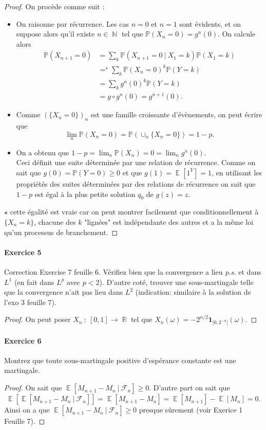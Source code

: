 \documentclass{article}
\theoremstyle{definition}
\numberwithin{equation}{section}
\DeclareMathOperator{\R}{\mathbb{R}}
\DeclareMathOperator{\N}{\mathbb{N}}
\DeclareMathOperator{\E}{\mathbb{E}}
\begin{document}
\begin{proof} On procède comme suit :
\begin{itemize}
    \item On raisonne par récurrence. Les cas $n=0$ et $n=1$ sont évidents, et on suppose alors qu'il existe $n\in\N$ tel que $\mathbb{P}(X_n=0)=g^n(0)$. On calcule alors
    \begin{align*} 
    \mathbb{P}(X_{n+1}=0) &= \sum_k \mathbb{P}(X_{n+1}=0~|~X_1=k)\mathbb{P}(X_1=k)\\
    &=^\star \sum_k \mathbb{P}(X_n=0)^k\mathbb{P}(Y=k)\\
    &= \sum_k g^n(0)^k \mathbb{P}(Y=k)\\
    &= g\circ g^n(0) = g^{n+1}(0). 
    \end{align*}
    \item Comme $(\{X_n=0\})_n$ est une famille croissante d'évènements, on peut écrire que 
    $$ \lim_n\mathbb{P}(X_n=0) = \mathbb{P}(\cup_n\{X_n=0\}) = 1-p. $$
    \item On a obtenu que $1-p=\lim_n\mathbb{P}(X_n)=0 = \lim_n g^n(0)$.\\
    Ceci définit une suite déterminée par une relation de récurrence. Comme on sait que $g(0)=\mathbb{P}(Y=0)\geq 0$ et que $g(1)=\E[1^Y]=1$, en utilisant les propriétés des suites déterminées par des relations de récurrence on sait que $1-p$ est égal à la plus petite solution $q_0$ de $g(z)=z$. 
\end{itemize}
$\star$ cette égalité est vraie car on peut montrer facilement que conditionnellement à $\{X_n=k\}$, chacune des $k$ "lignées" est indépendante des autres et a la même loi qu'un processus de branchement.
\end{proof}



\paragraph{Exercice 5} Correction Exercise 7 feuille 6.
Vérifiez bien que la convergence a lieu \textit{p.s.} et dans $L^1$ (en fait dans $L^p$ avec $p < 2$).
D'autre coté, trouver une sous-martingale telle que la convergence n'ait pas lieu dans $L^2$ (indication: similaire à la solution de l'exo 3 feuille 7).

\begin{proof}
On peut poser $X_n~:~[0,1]\to\R$ tel que $X_n(\omega)=-2^{n/2}\mathbf{1}_{[0,2^{-n}[}(\omega)$.
\end{proof}


\paragraph{Exercice 6}
Montrez que toute sous-martingale positive d'espérance constante est une martingale.
\begin{proof}
On sait que $\E[M_{n+1}-M_n~|~\mathcal{F}_n]\geq 0$. D'autre part on sait que $$ \E[\E[M_{n+1}-M_n~|~\mathcal{F}_n]]=\E[M_{n+1}-M_n] = \E[M_{n+1}]-\E[M_n] = 0. $$
Ainsi on a que $\E[M_{n+1}-M_n~|~\mathcal{F}_n]\geq 0$ presque sûrement (voir Exerice 1 Feuille 7).
\end{proof}
\end{document}
